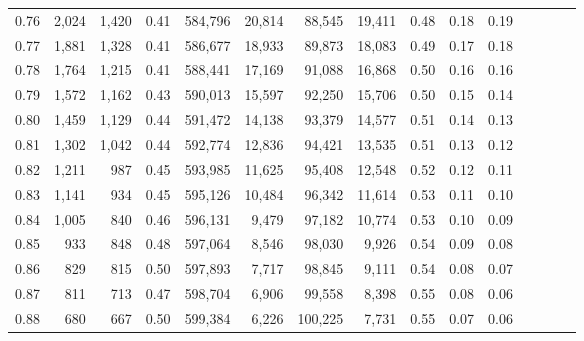 \begin{tabular}{rrrcrrrrrrrrrrr}
0.76 &   2,024 &  1,420 &                                       0.41 &  584,796 &   20,814 &   88,545 &   19,411 &  0.48 &  0.18 &                         0.19 \\
0.77 &   1,881 &  1,328 &                                       0.41 &  586,677 &   18,933 &   89,873 &   18,083 &  0.49 &  0.17 &                         0.18 \\
0.78 &   1,764 &  1,215 &                                       0.41 &  588,441 &   17,169 &   91,088 &   16,868 &  0.50 &  0.16 &                         0.16 \\
0.79 &   1,572 &  1,162 &                                       0.43 &  590,013 &   15,597 &   92,250 &   15,706 &  0.50 &  0.15 &                         0.14 \\
0.80 &   1,459 &  1,129 &                                       0.44 &  591,472 &   14,138 &   93,379 &   14,577 &  0.51 &  0.14 &                         0.13 \\
0.81 &   1,302 &  1,042 &                                       0.44 &  592,774 &   12,836 &   94,421 &   13,535 &  0.51 &  0.13 &                         0.12 \\
0.82 &   1,211 &    987 &                                       0.45 &  593,985 &   11,625 &   95,408 &   12,548 &  0.52 &  0.12 &                         0.11 \\
0.83 &   1,141 &    934 &                                       0.45 &  595,126 &   10,484 &   96,342 &   11,614 &  0.53 &  0.11 &                         0.10 \\
0.84 &   1,005 &    840 &                                       0.46 &  596,131 &    9,479 &   97,182 &   10,774 &  0.53 &  0.10 &                         0.09 \\
0.85 &     933 &    848 &                                       0.48 &  597,064 &    8,546 &   98,030 &    9,926 &  0.54 &  0.09 &                         0.08 \\
0.86 &     829 &    815 &                                       0.50 &  597,893 &    7,717 &   98,845 &    9,111 &  0.54 &  0.08 &                         0.07 \\
0.87 &     811 &    713 &                                       0.47 &  598,704 &    6,906 &   99,558 &    8,398 &  0.55 &  0.08 &                         0.06 \\
0.88 &     680 &    667 &                                       0.50 &  599,384 &    6,226 &  100,225 &    7,731 &  0.55 &  0.07 &                         0.06 \\

\end{tabular}
